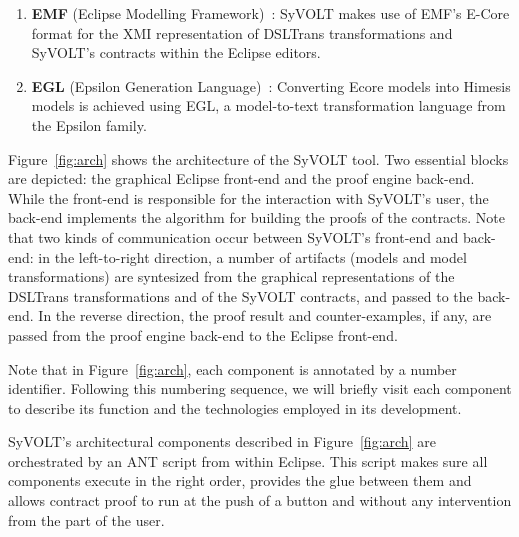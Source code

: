 \begin{enumerate}
  \item \textbf{EMF} (Eclipse Modelling Framework)~\cite{emfTool}: SyVOLT makes
  use of EMF's E-Core format for the XMI representation of DSLTrans transformations
  and SyVOLT's contracts within the Eclipse editors.
  \item \textbf{EGL} (Epsilon Generation Language)~\cite{eglTool}: Converting
  Ecore models into Himesis models is achieved using EGL, a
  model-to-text transformation language from the Epsilon family.
\end{enumerate}


Figure~\ref{fig:arch} shows the architecture of the SyVOLT tool. Two essential
blocks are depicted: the graphical Eclipse front-end and the proof engine
back-end. While the front-end is responsible for the interaction with SyVOLT's
user, the back-end implements the algorithm for building the proofs of the
contracts.
Note that two kinds of communication occur between SyVOLT's front-end and back-end:
in the left-to-right direction, a number of artifacts (models and model
transformations) are syntesized from the graphical representations of the
DSLTrans transformations and of the SyVOLT contracts, and passed to the
back-end. In the reverse direction, the proof result and counter-examples, if
any, are passed from the proof engine back-end to the Eclipse front-end.

Note that in Figure~\ref{fig:arch}, each component is annotated by a number
identifier. Following this numbering sequence, we will briefly visit each
component to describe its function and the technologies employed in its development.

SyVOLT's architectural components described in Figure~\ref{fig:arch} are
orchestrated by an ANT script from within Eclipse. This script makes sure all components execute in the
right order, provides the glue between them and allows contract proof to run at
the push of a button and without any intervention from the part of the user.


